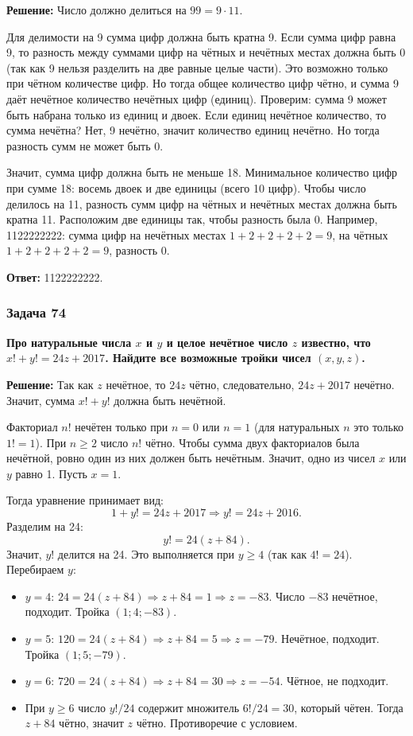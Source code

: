 \documentclass[12pt, a4paper]{article}
\begin{document}
\textbf{Решение:}
Число должно делиться на $99 = 9 \cdot 11$.

Для делимости на 9 сумма цифр должна быть кратна 9. Если сумма цифр равна 9, то разность между суммами цифр на чётных и нечётных местах должна быть 0 (так как 9 нельзя разделить на две равные целые части). Это возможно только при чётном количестве цифр. Но тогда общее количество цифр чётно, и сумма 9 даёт нечётное количество нечётных цифр (единиц). Проверим: сумма 9 может быть набрана только из единиц и двоек. Если единиц нечётное количество, то сумма нечётна? Нет, 9 нечётно, значит количество единиц нечётно. Но тогда разность сумм не может быть 0.

Значит, сумма цифр должна быть не меньше 18. Минимальное количество цифр при сумме 18: восемь двоек и две единицы (всего 10 цифр). Чтобы число делилось на 11, разность сумм цифр на чётных и нечётных местах должна быть кратна 11. Расположим две единицы так, чтобы разность была 0. Например, 1122222222: сумма цифр на нечётных местах $1+2+2+2+2=9$, на чётных $1+2+2+2+2=9$, разность 0.

\textbf{Ответ:} 1122222222.

\subsubsection*{Задача 74}
\textbf{Про натуральные числа $x$ и $y$ и целое нечётное число $z$ известно, что $x! + y! = 24z + 2017$. Найдите все возможные тройки чисел $(x, y, z)$.}

\textbf{Решение:}
Так как $z$ нечётное, то $24z$ чётно, следовательно, $24z + 2017$ нечётно. Значит, сумма $x! + y!$ должна быть нечётной.

Факториал $n!$ нечётен только при $n = 0$ или $n = 1$ (для натуральных $n$ это только $1! = 1$). При $n \ge 2$ число $n!$ чётно. Чтобы сумма двух факториалов была нечётной, ровно один из них должен быть нечётным. Значит, одно из чисел $x$ или $y$ равно 1. Пусть $x = 1$.

Тогда уравнение принимает вид:
\[
1 + y! = 24z + 2017 \Rightarrow y! = 24z + 2016.
\]
Разделим на 24:
\[
y! = 24(z + 84).
\]
Значит, $y!$ делится на 24. Это выполняется при $y \ge 4$ (так как $4! = 24$). Перебираем $y$:
\begin{itemize}
    \item $y = 4$: $24 = 24(z+84) \Rightarrow z + 84 = 1 \Rightarrow z = -83$. Число $-83$ нечётное, подходит. Тройка $(1; 4; -83)$.
    \item $y = 5$: $120 = 24(z+84) \Rightarrow z+84 = 5 \Rightarrow z = -79$. Нечётное, подходит. Тройка $(1; 5; -79)$.
    \item $y = 6$: $720 = 24(z+84) \Rightarrow z+84 = 30 \Rightarrow z = -54$. Чётное, не подходит.
    \item При $y \ge 6$ число $y!/24$ содержит множитель $6!/24 = 30$, который чётен. Тогда $z+84$ чётно, значит $z$ чётно. Противоречие с условием.
\end{itemize}
\end{document}
